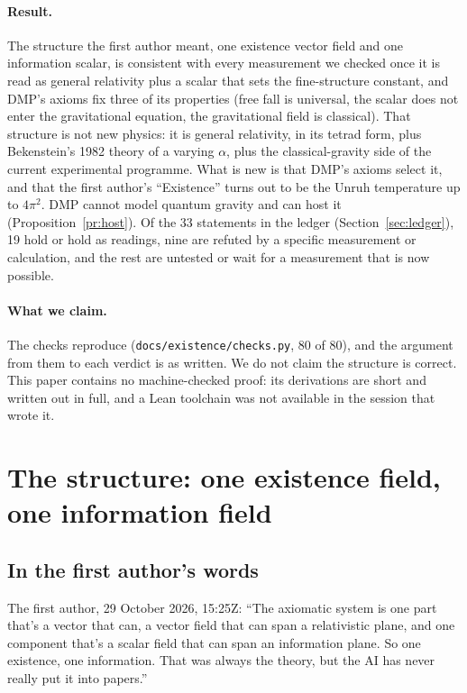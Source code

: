 \documentclass[11pt,a4paper]{article}
\theoremstyle{definition}
\theoremstyle{remark}
\begin{document}
\paragraph{Result.} The structure the first author meant, one existence vector field and one information scalar, is consistent with every
measurement we checked once it is read as general relativity plus a scalar that sets the fine-structure constant, and DMP's axioms fix
three of its properties (free fall is universal, the scalar does not enter the gravitational equation, the gravitational field is
classical). That structure is not new physics: it is general relativity, in its tetrad form, plus Bekenstein's 1982 theory of a varying
$\alpha$, plus the classical-gravity side of the current experimental programme. What is new is that DMP's axioms select it, and that the
first author's ``Existence'' turns out to be the Unruh temperature up to $4\pi^2$. DMP cannot model quantum gravity and can host it
(Proposition~\ref{pr:host}). Of the 33 statements in the ledger (Section~\ref{sec:ledger}), 19 hold or hold as readings, nine are refuted by a
specific measurement or calculation, and the rest are untested or wait for a measurement that is now possible.

\paragraph{What we claim.} The checks reproduce (\texttt{docs/existence/checks.py}, 80 of 80), and the argument from them to each
verdict is as written. We do not claim the structure is correct. This paper contains no machine-checked proof: its derivations are short
and written out in full, and a Lean toolchain was not available in the session that wrote it.

\section{The structure: one existence field, one information field}\label{sec:core}

\subsection{In the first author's words}

The first author, 29 October 2026, 15:25Z: ``The axiomatic system is one part that's a vector that can, a vector field that can span a
relativistic plane, and one component that's a scalar field that can span an information plane. So one existence, one information. That
was always the theory, but the AI has never really put it into papers.''
\end{document}
